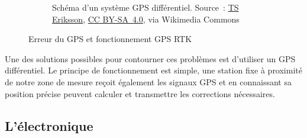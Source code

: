 \begin{figure}
\begin{subfigure}[t]{0.5\textwidth}
        \caption[Shema d'un systeme GPS differenciel]{Schéma d'un système GPS différentiel. Source~: \href{https://commons.wikimedia.org/wiki/File:Real_time_kinematic.svg}{TS Eriksson}, \href{https://creativecommons.org/licenses/by-sa/4.0}{CC BY-SA~4.0}, via Wikimedia Commons}
        \label{fig_RTK}
    \end{subfigure}
    \caption{Erreur du GPS et fonctionnement GPS RTK}
\end{figure}

Une des solutions possibles pour contourner ces problèmes est d'utiliser un GPS différentiel. Le principe de fonctionnement est simple, une station fixe à proximité de notre zone de mesure reçoit également les signaux GPS et en connaissant sa position précise peuvent calculer et transmettre les corrections nécessaires. \cite{site:GPS_diff}

\subsection{L'électronique}

    